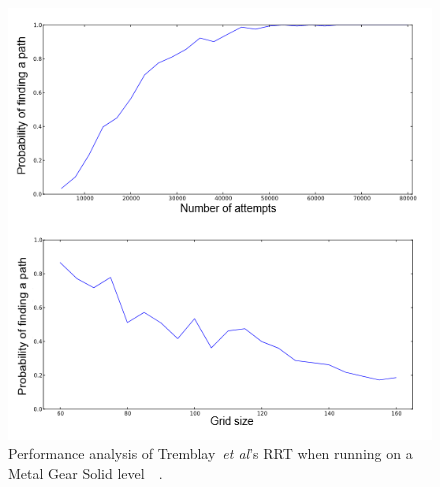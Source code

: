 \documentclass[journal]{IEEEtran}
\begin{document}
\begin{figure}[h]
	\includegraphics[width=1.0\linewidth]{Tremblay2013.png}
	\caption{ Performance analysis of Tremblay~\textit{et al}'s RRT when running on a Metal Gear Solid level~\cite{Tremblay2013}~\cite{game:MetalGearSolid}.}
	\label{TremblayRRT}
\end{figure} 
\end{document}
